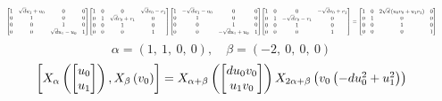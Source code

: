 \documentclass[11pt]{article}
\theoremstyle{definition}
\begin{document}
\[
\scaletoalign{\textwidth}{{\left[\begin{matrix}1 & \sqrt{d} u_{1} + u_{0} & 0 & 0\\0 & 1 & 0 & 0\\0 & 0 & 1 & 0\\0 & 0 & \sqrt{d} u_{1} - u_{0} & 1\end{matrix}\right]} {\left[\begin{matrix}1 & 0 & 0 & \sqrt{d} v_{0} - v_{1}\\0 & 1 & \sqrt{d} v_{0} + v_{1} & 0\\0 & 0 & 1 & 0\\0 & 0 & 0 & 1\end{matrix}\right]} {\left[\begin{matrix}1 & - \sqrt{d} u_{1} - u_{0} & 0 & 0\\0 & 1 & 0 & 0\\0 & 0 & 1 & 0\\0 & 0 & - \sqrt{d} u_{1} + u_{0} & 1\end{matrix}\right]} {\left[\begin{matrix}1 & 0 & 0 & - \sqrt{d} v_{0} + v_{1}\\0 & 1 & - \sqrt{d} v_{0} - v_{1} & 0\\0 & 0 & 1 & 0\\0 & 0 & 0 & 1\end{matrix}\right]} = {\left[\begin{matrix}1 & 0 & 2 \sqrt{d} \left(u_{0} v_{0} + u_{1} v_{1}\right) & 0\\0 & 1 & 0 & 0\\0 & 0 & 1 & 0\\0 & 0 & 0 & 1\end{matrix}\right]}}
\]
\[
\alpha = \left( 1, \  1, \  0, \  0\right), \quad \beta = \left( -2, \  0, \  0, \  0\right)
\]
\[
\scaletoalign{\textwidth}{\left[ X_{\alpha}\left(\left[\begin{matrix}u_{0}\\u_{1}\end{matrix}\right]\right), X_{\beta}\left(v_{0}\right) \right] = X_{\alpha + \beta}\left(\left[\begin{matrix}d u_{0} v_{0}\\u_{1} v_{0}\end{matrix}\right]\right) X_{2\alpha + \beta}\left(v_{0} \left(- d u_{0}^{2} + u_{1}^{2}\right)\right)}
\]
\end{document}
